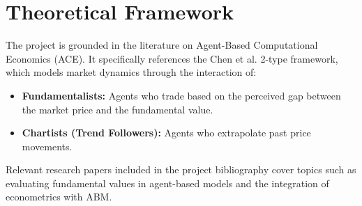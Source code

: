 \documentclass{article}
\begin{document}
\section{Theoretical Framework}
The project is grounded in the literature on Agent-Based Computational Economics (ACE). It specifically references the Chen et al. 2-type framework, which models market dynamics through the interaction of:
\begin{itemize}
    \item \textbf{Fundamentalists:} Agents who trade based on the perceived gap between the market price and the fundamental value.
    \item \textbf{Chartists (Trend Followers):} Agents who extrapolate past price movements.
\end{itemize}

Relevant research papers included in the project bibliography cover topics such as evaluating fundamental values in agent-based models and the integration of econometrics with ABM.
\end{document}
